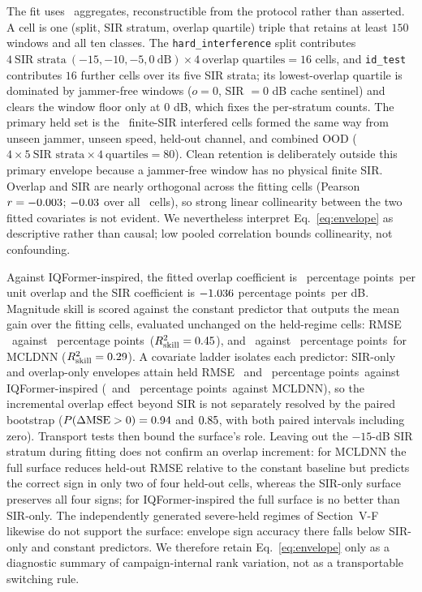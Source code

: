 \documentclass[letterpaper,journal]{IEEEtran}
\newcommand{\pp}{percentage points}
\begin{document}
The fit uses \EnvelopeFitCells\ aggregates, reconstructible from the protocol
rather than asserted. A cell is one (split, SIR stratum,
overlap quartile) triple that retains at least $150$ windows and all ten
classes. The \texttt{hard\_interference} split contributes
$4\ \text{SIR strata}\ (-15,-10,-5,0\ \text{dB})\times4\ \text{overlap
quartiles}=16$ cells, and \texttt{id\_test} contributes $16$ further cells
over its five SIR strata; its lowest-overlap quartile is dominated by
jammer-free windows ($o=0$, SIR $=0$ dB cache sentinel) and clears the window
floor only at $0$ dB, which fixes the per-stratum counts. The primary held set is the
\EnvelopeHoldoutCells\ finite-SIR interfered cells formed the same way from
unseen jammer, unseen speed, held-out channel, and combined OOD
($4\times5\ \text{SIR strata}\times4\ \text{quartiles}=80$). Clean retention is
deliberately outside this primary envelope because a jammer-free window has no
physical finite SIR.
Overlap and SIR are nearly orthogonal across the fitting cells
(Pearson $r=-0.003$; $-0.03$ over all
\EnvelopeCellCount\ cells), so strong linear collinearity between the two
fitted covariates is not evident. We nevertheless interpret
Eq.~\eqref{eq:envelope} as descriptive rather than causal; low pooled
correlation bounds collinearity, not confounding.

Against IQFormer-inspired, the fitted overlap coefficient is
\EnvelopeIqformerOccupancySlope\ \pp\ per unit overlap and the SIR
coefficient is $-1.036$ \pp\ per dB. Magnitude skill is
scored against the constant predictor that outputs the mean gain over the
fitting cells, evaluated unchanged on the held-regime cells: RMSE
\EnvelopeIqformerHoldoutRmse\ against \EnvelopeConstantRmseIQ\ \pp\
($R^2_{\mathrm{skill}}=0.45$), and
\EnvelopeMcldnnHoldoutRmse\ against \EnvelopeConstantRmseMC\ \pp\ for MCLDNN
($R^2_{\mathrm{skill}}=0.29$). A covariate ladder isolates
each predictor: SIR-only and overlap-only envelopes attain held RMSE
\LadderSirOnlyRmseIQ\ and \LadderOverlapOnlyRmseIQ\ \pp\ against
IQFormer-inspired (\LadderSirOnlyRmseMC\ and \LadderOverlapOnlyRmseMC\ \pp\
against MCLDNN), so the incremental overlap effect beyond SIR is not
separately resolved by the paired bootstrap
($P(\Delta\mathrm{MSE}>0)=0.94$ and $0.85$, with both
paired intervals including zero). Transport tests then bound the surface's
role. Leaving out the $-15$-dB SIR stratum during fitting does not confirm an
overlap increment: for MCLDNN the full surface reduces held-out RMSE relative
to the constant baseline but predicts the correct sign in only two of four
held-out cells, whereas the SIR-only surface preserves all four signs; for
IQFormer-inspired the full surface is no better than SIR-only. The
independently generated severe-held regimes of Section~V-F likewise do not
support the surface: envelope sign accuracy there falls below SIR-only and
constant predictors. We therefore retain
Eq.~\eqref{eq:envelope} only as a diagnostic summary of campaign-internal
rank variation, not as a transportable switching rule.
\end{document}
